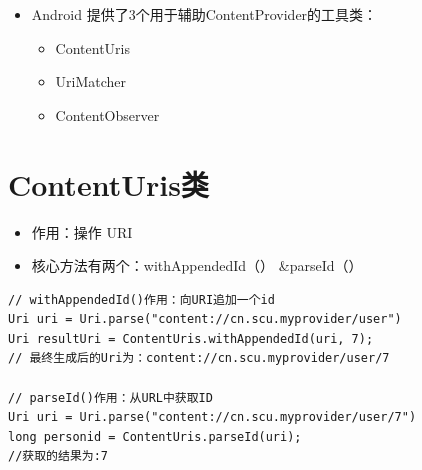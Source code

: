 \documentclass[9pt, b5paaper]{book}
\begin{document}
\begin{itemize}
\item Android 提供了3个用于辅助ContentProvider的工具类：
\begin{itemize}
\item ContentUris
\item UriMatcher
\item ContentObserver
\end{itemize}
\end{itemize}
\section{ContentUris类}
\label{sec-5-5}
\begin{itemize}
\item 作用：操作 URI
\item 核心方法有两个：withAppendedId（） \&parseId（）
\end{itemize}
\begin{verbatim}
// withAppendedId()作用：向URI追加一个id
Uri uri = Uri.parse("content://cn.scu.myprovider/user") 
Uri resultUri = ContentUris.withAppendedId(uri, 7);  
// 最终生成后的Uri为：content://cn.scu.myprovider/user/7

// parseId()作用：从URL中获取ID
Uri uri = Uri.parse("content://cn.scu.myprovider/user/7") 
long personid = ContentUris.parseId(uri); 
//获取的结果为:7
\end{verbatim}
\end{document}

